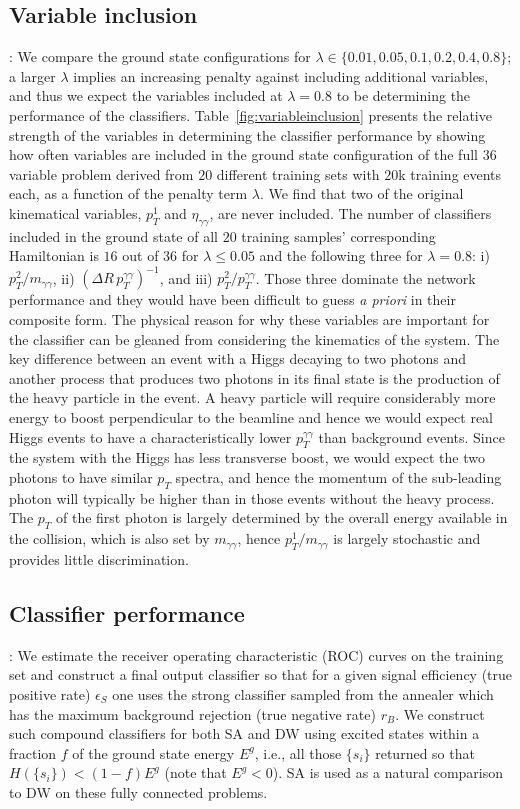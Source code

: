 \subsection{Variable inclusion}:
We compare  the ground state configurations for $\lambda\in\{0.01,0.05,0.1,0.2,0.4,0.8\}$; a larger $\lambda$ implies an increasing penalty against including additional variables, and thus we expect the variables included at $\lambda=0.8$ to be determining the performance of the classifiers. Table~\ref{fig:variableinclusion} presents the relative strength of the variables in determining the classifier performance by showing how often variables are included in the ground state configuration of the full $36$ variable problem derived from $20$ different training sets with $20$k training events each, as a function of the penalty term $\lambda$.   We find that two of the original kinematical variables, $p_T^1$ and $\eta_{\gamma\gamma}$, are never included.  The number of classifiers included in the ground state of all $20$ training samples' corresponding Hamiltonian is $16$ out of $36$ for $\lambda\leq 0.05$ and the following three for $\lambda=0.8$: i) $p_T^2/m_{\gamma\gamma}$, ii) $(\Delta R\, p_T^{\gamma\gamma})^{-1}$, and iii) $p_T^2/p_T^{\gamma\gamma}$. Those three dominate the network performance and they would have been difficult to guess \textit{a priori} in their composite form.  The physical reason for why these variables are important for the classifier can be gleaned from considering the kinematics of the system.  The key difference between an event with a Higgs decaying to two photons and another process that produces two photons in its final state is the production of the heavy particle in the event.  A heavy particle will require considerably more energy to boost perpendicular to the beamline and hence we would expect real Higgs events to have a characteristically lower $p_{T}^{\gamma\gamma}$ than background events.  Since the system with the Higgs has less transverse boost, we would expect the two photons to have similar $p_T$ spectra, and hence the momentum of the sub-leading photon will typically be higher than in those events without the heavy process.  The $p_T$ of the first photon is largely determined by the overall energy available in the collision, which is also set by $m_{\gamma\gamma}$, hence $p_T^1/m_{\gamma\gamma}$ is largely stochastic and provides little discrimination.


\subsection{Classifier performance}:
We estimate the receiver operating characteristic  (ROC) curves on the training set and construct a final output classifier so that for a given signal efficiency (true positive rate) $\epsilon_S$ one uses the strong classifier sampled from the annealer which has the maximum background rejection (true negative rate) $r_B$. We construct such compound classifiers for both SA and DW using excited states within a fraction $f$ of the ground state energy $E^g$, i.e., all those $\{s_i\}$ returned so that $H(\{s_i\})<(1-f)E^g$ (note that $E^g<0$). SA is used as a natural comparison to DW on these fully connected problems.

